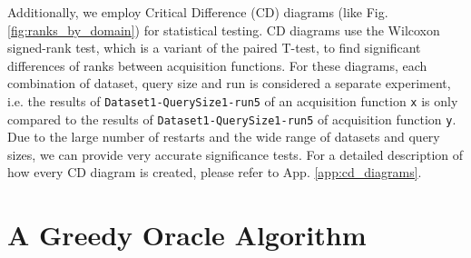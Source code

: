 \documentclass[]{article}
\begin{document}
Additionally, we employ Critical Difference (CD) diagrams (like Fig. \ref{fig:ranks_by_domain}) for statistical testing.
CD diagrams use the Wilcoxon signed-rank test, which is a variant of the paired T-test, to find significant differences of ranks between acquisition functions.
For these diagrams, each combination of dataset, query size and run is considered a separate experiment, i.e. the results of \verb|Dataset1-QuerySize1-run5| of an acquisition function \verb|x| is only compared to the results of \verb|Dataset1-QuerySize1-run5| of acquisition function \verb|y|.
Due to the large number of restarts and the wide range of datasets and query sizes, we can provide very accurate significance tests.
For a detailed description of how every CD diagram is created, please refer to App. \ref{app:cd_diagrams}.

\section{A Greedy Oracle Algorithm}\label{sec:oracle}
\end{document}
